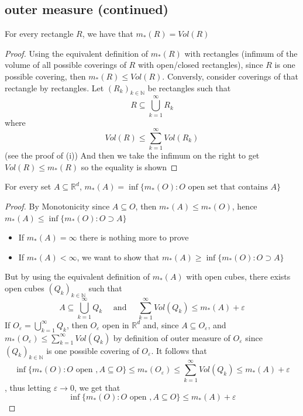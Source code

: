\documentclass{tufte-handout}
\begin{document}
\subsection{outer measure (continued)}
For every rectangle $R$, we have that $m_* (R) = Vol(R)$
\begin{proof}
	Using the equivalent definition of $m_*(R)$ with rectangles (infimum of the volume of all possible coverings of $R$ with open/closed rectangles), since $R$ is one possible covering, then $m_*(R) \leq Vol(R)$. Conversly, consider coverings of that rectangle by rectangles. Let $(R_k)_{k \in \mathbb{N}}$ be rectangles such that 
	$$ R \subseteq \bigcup_{k = 1}^\infty R_k$$
	where 
	$$ Vol(R) \leq \sum_{k = 1}^\infty Vol(R_k)$$
	(see the proof of (i))
	And then we take the infimum on the right to get $Vol(R) \leq m_*(R)$ so the equality is shown	
\end{proof}
\begin{proposition}
		For every set $A \subseteq \mathbb{R}^d$, $m_*(A) = \inf \{m_*(O) \colon O \text{ open set that contains } A\}$
	\end{proposition}
	\begin{proof}
		By Monotonicity since $A \subseteq O$, then $m_*(A) \leq m_*(O)$, hence  $m_*(A) \leq \inf \{m_*(O) \colon O\supset A\}$ 
		\begin{itemize}
			\item If $m_*(A) = \infty$ there is nothing more to prove
			\item If $m_*(A) < \infty$, we want to show that $m_*(A) \geq \inf\{m_*(O) \colon O \supset A\}$

		\end{itemize}
		But by using the equivalent definition of $m_*(A)$ with open cubes, there exists open cubes $(Q_k)_{k \in \mathbb{N}}$ such that 
		$$ A \subseteq \bigcup_{k = 1}^\infty Q_k \quad \text{ and } \quad \sum_{k = 1}^\infty Vol(Q_k) \leq m_*(A) + \varepsilon$$
		If $O_\varepsilon = \bigcup_{k=1}^\infty Q_k$, then $O_\varepsilon$ open in $\mathbb{R}^d$ and, since $A \subseteq O_\varepsilon$, and $m_*(O_\varepsilon) \leq \sum_{k=1}^\infty Vol(Q_k)$ by definition of outer measure of $O_\varepsilon$ since $(Q_k)_{k \in \mathbb{N}}$ is one possible covering of $O_\varepsilon$. It follows that 
		$$\inf\{m_*(O) \colon O \text{ open }, A \subseteq O\} \leq m_*(O_\varepsilon) \leq \sum_{k=1}^\infty Vol(Q_k) \leq m_*(A) + \varepsilon$$, thus letting $\varepsilon \to 0$, we get that 
		\[ \inf\{m_*(O) \colon O \text{ open }, A \subseteq O\} \leq m_*(A) + \varepsilon \]
	\end{proof}
\end{document}
